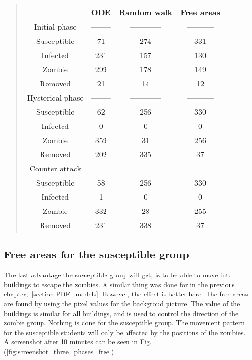 \documentclass[%
twoside,                 %
final,                   %
chapterprefix=true,      %
open=right               %
10pt]{book}
\begin{document}
\label{table:compare_ODE_random}

\begin{quote}
\begin{tabular}{cccc}
\hline
\multicolumn{1}{c}{  } & \multicolumn{1}{c}{ ODE } & \multicolumn{1}{c}{ Random walk } & \multicolumn{1}{c}{ Free areas } \\
\hline
Initial phase    & -------- & ------------ & ----------- \\
\hline
Susceptible      & 71       & 274          & 331         \\
Infected         & 231      & 157          & 130         \\
Zombie           & 299      & 178          & 149         \\
Removed          & 21       & 14           & 12          \\
\hline
Hysterical phase & -------- & ------------ & ----------- \\
\hline
Susceptible      & 62       & 256          & 330         \\
Infected         & 0        & 0            & 0           \\
Zombie           & 359      & 31           & 256         \\
Removed          & 202      & 335          & 37          \\
\hline
Counter attack   & -------- & ------------ & ----------- \\
\hline
Susceptible      & 58       & 256          & 330         \\
Infected         & 1        & 0            & 0           \\
Zombie           & 332      & 28           & 255         \\
Removed          & 231      & 338          & 37          \\
\hline
\end{tabular}
\end{quote}

\noindent




\subsection{Free areas for the susceptible group}
The last advantage the susceptible group will get, is to be able to move into buildings to escape the zombies. A similar thing was done for in the previous chapter,~\ref{section:PDE_models}. However, the effect is better here. The free areas are found by using the pixel values for the backgroud picture. The value of the buildings is similar for all buildings, and is used to control the direction of the zombie group. Nothing is done for the susceptible group. The movement pattern for the susceptible students will only be affected by the positions of the zombies. A screenshot after 10 minutes can be seen in Fig.(\ref{fig:screenshot_three_phases_free})
\end{document}
